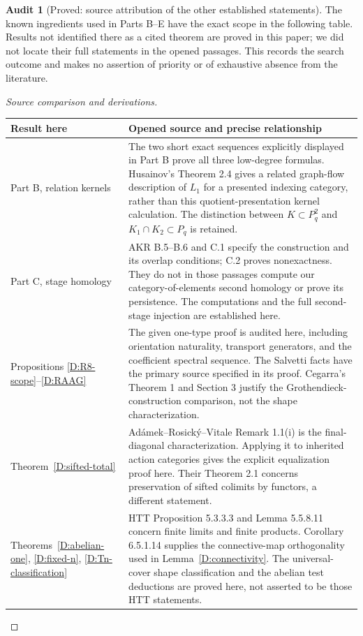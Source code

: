 \documentclass[11pt,a4paper]{article}
\theoremstyle{definition}
\newtheorem{audit}[theorem]{Audit}
\begin{document}
\begin{audit}[Proved: source attribution of the other established statements]\label{F:attribution}
The known ingredients used in Parts B--E have the exact scope in the following table. Results not identified there as a cited theorem are proved in this paper; we did not locate their full statements in the opened passages. This records the search outcome and makes no assertion of priority or of exhaustive absence from the literature.
\end{audit}
\begin{proof}[Source comparison and derivations]
\begin{longtable}{@{}p{}p{}@{}}
\toprule
Result here & Opened source and precise relationship\\
\midrule\endhead
Part B, relation kernels & The two short exact sequences explicitly displayed in Part B prove all three low-degree formulas. Husainov's Theorem 2.4 gives a related graph-flow description of $L_1$ for a presented indexing category, rather than this quotient-presentation kernel calculation. The distinction between $K\subset P_q^2$ and $K_1\cap K_2\subset P_q$ is retained.\\
Part C, stage homology & AKR B.5--B.6 and C.1 specify the construction and its overlap conditions; C.2 proves nonexactness. They do not in those passages compute our category-of-elements second homology or prove its persistence. The computations and the full second-stage injection are established here.\\
Propositions \ref{D:R8-scope}--\ref{D:RAAG} & The given one-type proof is audited here, including orientation naturality, transport generators, and the coefficient spectral sequence. The Salvetti facts have the primary source specified in its proof. Cegarra's Theorem 1 and Section 3 justify the Grothendieck-construction comparison, not the shape characterization.\\
Theorem~\ref{D:sifted-total} & Ad\'amek--Rosick\'y--Vitale Remark 1.1(i) is the final-diagonal characterization. Applying it to inherited action categories gives the explicit equalization proof here. Their Theorem 2.1 concerns preservation of sifted colimits by functors, a different statement.\\
Theorems~\ref{D:abelian-one}, \ref{D:fixed-n}, \ref{D:Tn-classification} & HTT Proposition 5.3.3.3 and Lemma 5.5.8.11 concern finite limits and finite products. Corollary 6.5.1.14 supplies the connective-map orthogonality used in Lemma~\ref{D:connectivity}. The universal-cover shape classification and the abelian test deductions are proved here, not asserted to be those HTT statements.\\

\end{longtable}
\end{proof}
\end{document}
